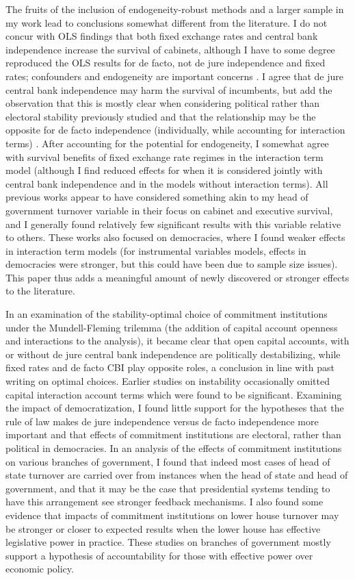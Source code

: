 \documentclass{article}
\begin{document}
    The fruits of the inclusion of endogeneity-robust methods and a larger sample in my work lead to conclusions somewhat different from the literature. I do not concur with OLS findings that both fixed exchange rates and central bank independence increase the survival of cabinets, although I have to some degree reproduced the OLS results for de facto, not de jure independence and fixed rates; confounders and endogeneity are important concerns \citep{bernhard_political_2002-1}. I agree that de jure central bank independence may harm the survival of incumbents, but add the observation that this is mostly clear when considering political rather than electoral stability previously studied and that the relationship may be the opposite for de facto independence (individually, while accounting for interaction terms) \citep{clark_monetary_2013}. After accounting for the potential for endogeneity, I somewhat agree with survival benefits of fixed exchange rate regimes in the interaction term model (although I find reduced effects for when it is considered jointly with central bank independence and in the models without interaction terms). All previous works appear to have considered something akin to my head of government turnover variable in their focus on cabinet and executive survival, and I generally found relatively few significant results with this variable relative to others. These works also focused on democracies, where I found weaker effects in interaction term models (for instrumental variables models, effects in democracies were stronger, but this could have been due to sample size issues). This paper thus adds a meaningful amount of newly discovered or stronger effects to the literature.

    In an examination of the stability-optimal choice of commitment institutions under the Mundell-Fleming trilemma (the addition of capital account openness and interactions to the analysis), it became clear that open capital accounts, with or without de jure central bank independence are politically destabilizing, while fixed rates and de facto CBI play opposite roles, a conclusion in line with past writing on optimal choices. Earlier studies on instability occasionally omitted capital interaction account terms which were found to be significant. Examining the impact of democratization, I found little support for the hypotheses that the rule of law makes de jure independence versus de facto independence more important and that effects of commitment institutions are electoral, rather than political in democracies. In an analysis of the effects of commitment institutions on various branches of government, I found that indeed most cases of head of state turnover are carried over from instances when the head of state and head of government, and that it may be the case that presidential systems tending to have this arrangement see stronger feedback mechanisms. I also found some evidence that impacts of commitment institutions on lower house turnover may be stronger or closer to expected results when the lower house has effective legislative power in practice. These studies on branches of government mostly support a hypothesis of accountability for those with effective power over economic policy.
\end{document}
